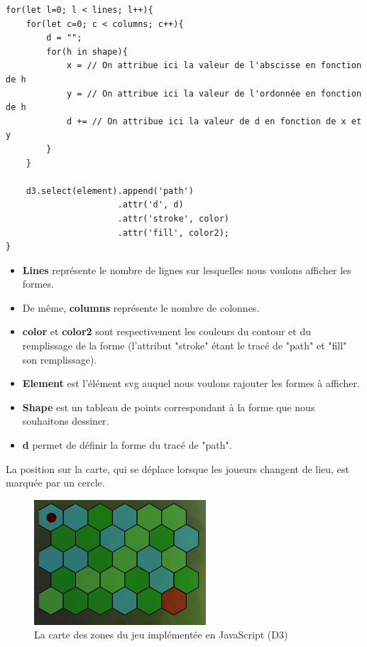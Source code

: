 \documentclass[12pt]{report}
\begin{document}
	\begin{verbatim}
for(let l=0; l < lines; l++){
    for(let c=0; c < columns; c++){
        d = "";
        for(h in shape){
            x = // On attribue ici la valeur de l'abscisse en fonction de h
            y = // On attribue ici la valeur de l'ordonnée en fonction de h
            d += // On attribue ici la valeur de d en fonction de x et y
        }
    }

    d3.select(element).append('path')
                      .attr('d', d)
                      .attr('stroke', color)
                      .attr('fill', color2);
}
	\end{verbatim}

	\begin{itemize}
        	\item \textbf{Lines} représente le nombre de lignes sur lesquelles nous voulons afficher les formes.
        	\item De même, \textbf{columns} représente le nombre de colonnes. \item \textbf{color} et \textbf{color2} sont respectivement les couleurs du contour et du remplissage de la forme (l'attribut "stroke" étant le tracé de "path" et "fill" son remplissage). \item \textbf{Element} est l'élément svg auquel nous voulons rajouter les formes à afficher.
        	\item \textbf{Shape} est un tableau de points correspondant à la forme que nous souhaitons dessiner.
        	\item \textbf{d} permet de définir la forme du tracé de "path".
	\end{itemize}

	La position sur la carte, qui se déplace lorsque les joueurs changent de lieu, est marquée par un cercle.

	\begin{figure}[h!]
		\centering
		\includegraphics[scale=0.8]{map}
		\caption{La carte des zones du jeu implémentée en JavaScript (D3)}
		\label{fig:map}
	\end{figure}
\end{document}
